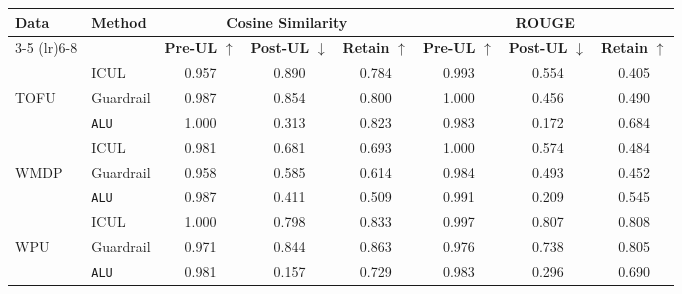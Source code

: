 \begin{table*}[]
    \centering
    \caption{Comparison of Methods using Cosine Similarity and ROUGE Metrics with phi-1.5}
    \begin{tabular}{llccc|ccc}
        \toprule
        \textbf{Data}&\textbf{Method} & \multicolumn{3}{c}{\textbf{Cosine Similarity}} & \multicolumn{3}{c}{\textbf{ROUGE}} \\
        \cmidrule(lr){3-5} \cmidrule(lr){6-8}
         & & \textbf{Pre-UL} $\uparrow$ & \textbf{Post-UL} $\downarrow$ & \textbf{Retain} $\uparrow$ & \textbf{Pre-UL} $\uparrow$ & \textbf{Post-UL} $\downarrow$ & \textbf{Retain} $\uparrow$ \\
        \midrule
        &ICUL & 0.957 & 0.890 & 0.784 & 0.993 & 0.554 & 0.405 \\
        TOFU &Guardrail & 0.987 & 0.854 & 0.800 & 1.000 & 0.456 & 0.490 \\
        &\texttt{ALU}  & 1.000 & 0.313 & 0.823 & 0.983 & 0.172 & 0.684 \\
        \midrule
        &ICUL  & 0.981 & 0.681 & 0.693 & 1.000 & 0.574 & 0.484 \\
        WMDP & Guardrail  & 0.958 & 0.585 & 0.614 & 0.984 & 0.493 & 0.452 \\
        &\texttt{ALU} & 0.987 & 0.411 & 0.509 & 0.991 & 0.209 & 0.545 \\
        \midrule
        &ICUL  & 1.000 & 0.798 & 0.833 & 0.997 & 0.807 & 0.808 \\
        WPU &Guardrail & 0.971 & 0.844 & 0.863 & 0.976 & 0.738 & 0.805 \\
        &\texttt{ALU} & 0.981 & 0.157 & 0.729 & 0.983 & 0.296 & 0.690 \\
        
        \bottomrule
    \end{tabular}
\label{tab:t17}    
\end{table*}

